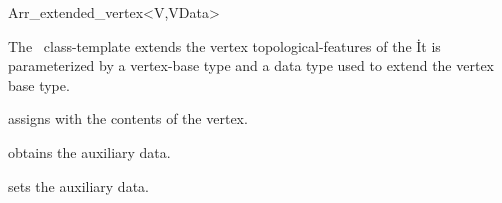 
\ccRefPageBegin

\begin{ccRefClass}{Arr_extended_vertex<V,VData>}

\ccDefinition
  The \ccRefName\ class-template extends the vertex topological-features of the
  \dcel\. It is parameterized by a vertex-base type  and a data type
   used to extend the vertex base type.


\ccIsModel

\ccInheritsFrom

\ccCreation
  {assigns \ccVar{} with the contents of the  vertex.}

\ccAccessFunctions
  {obtains the auxiliary data.}

\ccModifiers
  {sets the auxiliary data.}

\ccSeeAlso

\end{ccRefClass}

\ccRefPageEnd
